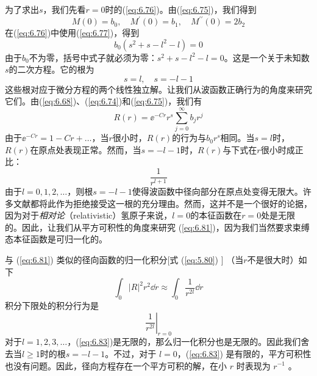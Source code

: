    为了求出$s$，我们先看$r=0$时的(\ref{eq:6.76})。由(\ref{eq:6.75})，我们得到
   \begin{equation}
        M\left(0\right) = b_0, \quad M^{\prime}\left(0\right) = b_1, \quad M^{\prime\prime}\left(0\right) = 2b_2
        \label{eq:6.77}
   \end{equation}
   在(\ref{eq:6.76})中使用(\ref{eq:6.77})，得到
   \begin{equation}
        b_0\left(s^2+s-l^2-l\right) = 0
        \label{eq:6.78}
   \end{equation}
   由于$b_0$不为零，括号中式子就必须为零：$s^2+s-l^2-l=0$。这是一个关于未知数$s$的二次方程。它的根为
   \begin{equation}
        s = l, \quad s = -l-1
        \label{eq:6.79}
    \end{equation}
    这些根对应于微分方程的两个线性独立解。让我们从波函数正确行为的角度来研究它们。由(\ref{eq:6.68})、(\ref{eq:6.74})和(\ref{eq:6.75})，我们有
    \begin{equation}
        R\left(r\right) = \ee ^{-Cr}r^s\sum_{j=0}^{\infty}b_jr^j
        \label{eq:6.80}
    \end{equation}
    由于$\ee ^{-Cr} = 1-Cr+\ldots$，当$r$很小时，$R\left(r\right)$的行为与$b_0r^s$相同。当$s=l$时，$R\left(r\right)$在原点处表现正常。然而，当$s = -l-1$时，$R\left(r\right)$与下式在$r$很小时成正比：
    \begin{equation}
        \frac{1}{r^{l+1}}
        \label{eq:6.81}
    \end{equation}
    由于$l=0,1,2,\ldots$，则根$s=-l-1$使得波函数中径向部分在原点处变得无限大。许多文献都将此作为拒绝接受这一根的充分理由。然而，这并不是一个很好的论据，因为对于\textit{相对论}（relativistic）氢原子来说，$l=0$的本征函数在$r=0$处是无限的。因此，让我们从平方可积性的角度来研究 (\ref{eq:6.81})，因为我们当然要求束缚态本征函数是可归一化的。

    与 (\ref{eq:6.81}) 类似的径向函数的归一化积分[式 (\ref{eq:5.80}) ] （当$r$不是很大时）如下
    \begin{equation}
        \int_{0}\left|R\right|^2r^2\dd r \approx \int_{0}\frac{1}{r^{2l}}\dd r
        \label{eq:6.82}
    \end{equation}
    积分下限处的积分行为是
    \begin{equation}
        \left.\frac{1}{r^{2l}}\right|_{r=0}
        \label{eq:6.83}
    \end{equation}
    对于$l=1,2,3,\ldots$，(\ref{eq:6.83})是无限的，那么归一化积分也是无限的。因此我们舍去当$l \geq 1$时的根$s = -l-1$。不过，对于 $l=0$，(\ref{eq:6.83}) 是有限的，平方可积性也没有问题。因此，径向方程存在一个平方可积的解，在小 $r$ 时表现为 $r^{-1}$ 。

